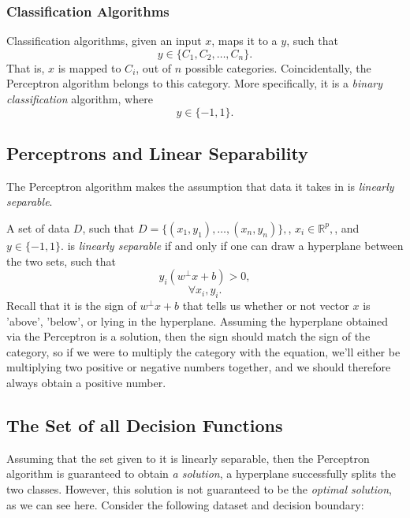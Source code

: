 \subsubsection{Classification Algorithms}
Classification algorithms, given an input $x$, maps it to a $y$, such that
\[
    y \in \{C_1, C_2, \dots, C_n\}.
\]
That is, $x$ is mapped to $C_i$, out of $n$ possible categories.
Coincidentally, the Perceptron algorithm belongs to this category. More specifically, it is a \textit{binary classification} algorithm, where 
\[
    y \in \{-1, 1\}.
\]

\subsection{Perceptrons and Linear Separability}
The Perceptron algorithm makes the assumption that data it takes in is \textit{linearly separable}.

A set of data $D$, such that
$
    D = \{(x_1,y_1), \dots,(x_n, y_n)\},
$, $
    x_i \in \mathbb{R}^p,
$, and $
    y \in \{-1, 1\}.
$ is \textit{linearly separable} if and only if one can draw a hyperplane between the two sets, such that
\[
    y_i(w^\perp x +b) > 0,
\] \[
    \forall x_i, y_i.
\]
Recall that it is the sign of $w^\perp x+b$ that tells us whether or not vector $x$ is 'above', 'below', or lying in the hyperplane. Assuming the hyperplane obtained via the Perceptron is a solution, then the sign should match the sign of the category, so if we were to multiply the category with the equation, we'll either be multiplying two positive or negative numbers together, and we should therefore always obtain a positive number.

\subsection{The Set of all Decision Functions}
Assuming that the set given to it is linearly separable, then the Perceptron algorithm is guaranteed to obtain \textit{a solution}, a hyperplane successfully splits the two classes. However, this solution is not guaranteed to be the \textit{optimal solution}, as we can see here. Consider the following dataset and decision boundary:


